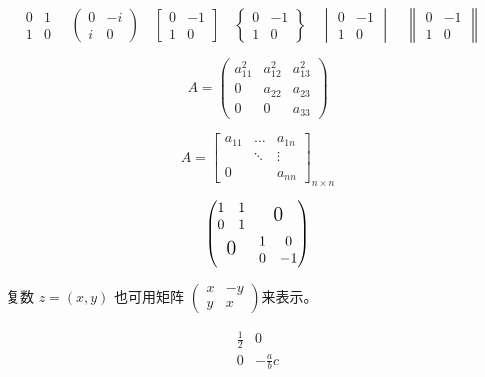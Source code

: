 \documentclass{article}
\begin{document}
	\[
	\begin{matrix}
		0 & 1\\
		1 & 0		
	\end{matrix} \quad
	\begin{pmatrix}
		0 & -i\\
		i & 0
	\end{pmatrix} \quad
	\begin{bmatrix}
		0 & -1\\
		1 & 0
	\end{bmatrix} \quad
	\begin{Bmatrix}
		0 & -1\\
		1 & 0
	\end{Bmatrix} \quad
	\begin{vmatrix}
		0 & -1\\
		1 & 0
	\end{vmatrix} \quad
	\begin{Vmatrix}
		0 & -1\\
		1 & 0
	\end{Vmatrix} \quad
	\]
	
	\[
	A = \begin{pmatrix}
		a_{11}^2 & a_{12}^2 & a_{13}^2\\
		0 & a_{22} & a_{23}\\
		0 & 0 & a_{33}
	\end{pmatrix}
	\]
	
	\[
	A = \begin{bmatrix}
		a_{11} & \dots & a_{1n}\\
		& \ddots & \vdots\\
		0 & & a_{nn}
	\end{bmatrix}_{n \times n}
	\]
	
	\[
	\begin{pmatrix}
		\begin{matrix} 1&1\\0&1 \end{matrix}
		& \text{\Large 0}\\
		\text{\Large 0} & \begin{matrix}
		1&0\\0&-1 \end{matrix}	
	\end{pmatrix}
	\]
	
	复数 $z = (x, y)$ 也可用矩阵
	\begin{math}
		\left( %
		\begin{smallmatrix}
			x & -y \\ y & x
		\end{smallmatrix}
		\right) %
	\end{math}来表示。

	\[
	\begin{array}{r|r}
		\frac{1}{2} & 0\\
		\hline
		0 & -\frac{a}{b}c\\
	\end{array}
	\]
	
\end{document}
